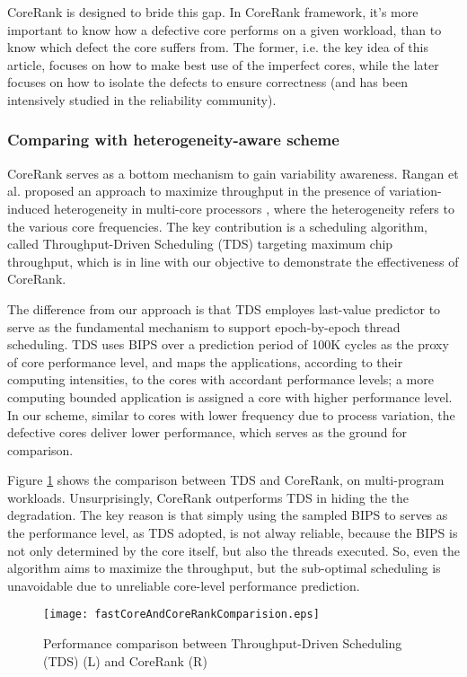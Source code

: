 CoreRank is designed to bride this gap. In CoreRank framework, it's more important to know how a defective core performs on a given workload, than to know which defect the core suffers from.  The former, i.e. the key idea of this article, focuses on how to make best use of the imperfect cores, while the later focuses on how to isolate the defects to ensure correctness (and has been intensively studied in the reliability community).   



\subsubsection{Comparing with heterogeneity-aware scheme}
CoreRank serves as a bottom mechanism to gain variability awareness.  Rangan et al. proposed an approach to maximize throughput in the presence of variation-induced heterogeneity in multi-core processors \cite{TDS}, where the heterogeneity refers to the various core frequencies. The key contribution is a scheduling algorithm, called Throughput-Driven Scheduling (TDS) targeting maximum chip throughput, which is in line with our objective to demonstrate the effectiveness of CoreRank.  

The difference from our approach is that TDS employes last-value predictor to serve as the fundamental mechanism to support epoch-by-epoch thread scheduling. TDS uses BIPS over a prediction period of 100K cycles  as the proxy of core performance level, and maps the applications, according to their computing intensities, to the cores with accordant performance levels; a more computing bounded application is assigned a core with higher performance level.   In our scheme, similar to cores with lower frequency due to process variation, the defective cores deliver lower performance, which serves as the ground for comparison. 

Figure \ref{compheteroaware} shows the comparison between TDS and CoreRank, on multi-program workloads.  Unsurprisingly, CoreRank outperforms TDS in hiding the the degradation. The key reason is that simply using the sampled BIPS to serves as the performance level, as TDS adopted,  is not alway reliable, because the BIPS is not only determined by the core itself, but also the threads executed. So, even the algorithm aims to maximize the throughput, but the sub-optimal scheduling is unavoidable due to unreliable core-level performance prediction.    


\begin{figure}[t]
 \centering
  \texttt{[image: fastCoreAndCoreRankComparision.eps]}\\
\caption{Performance comparison between Throughput-Driven Scheduling (TDS) (L) and  CoreRank (R)}
\label{compheteroaware}
\end{figure}



